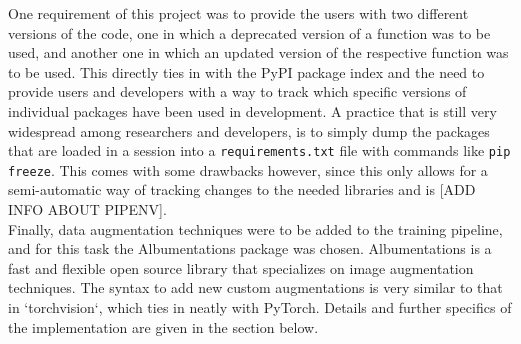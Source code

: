 \documentclass{article}
\begin{document}
One requirement of this project was to provide the users with two different versions of the code, one in which a deprecated version of a function was to be used, and another one in which an updated version of the respective function was to be used. This directly ties in with the PyPI package index and the need to provide users and developers with a way to track which specific versions of individual packages have been used in development. A practice that is still very widespread among researchers and developers, is to simply dump the packages that are loaded in a session into a \texttt{requirements.txt} file with commands like \texttt{pip freeze}. This comes with some drawbacks however, since this only allows for a semi-automatic way of tracking changes to the needed libraries and is [ADD INFO ABOUT PIPENV]. \\
Finally, data augmentation techniques were to be added to the training pipeline, and for this task the Albumentations \cite{albumentations} package was chosen. Albumentations is a fast and flexible open source library that specializes on image augmentation techniques. The syntax to add new custom augmentations is very similar to that in `torchvision`, which ties in neatly with PyTorch. 
Details and further specifics of the implementation are given in the section below.
\end{document}
